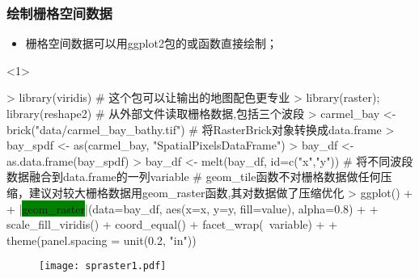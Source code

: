 \subsubsection{绘制栅格空间数据}
\begin{frame}[t,fragile]{\subsecname}{\subsubsecname}
\begin{itemize} 
\item<1-> 栅格空间数据可以用ggplot2包的或函数直接绘制；
\end{itemize}

\begin{overlayarea}{\textwidth}{\textheight}
\begin{onlyenv}<1>
\begin{rcode}
> library(viridis) # 这个包可以让输出的地图配色更专业 
> library(raster); library(reshape2)
# 从外部文件读取栅格数据,包括三个波段
> carmel_bay <- brick("data/carmel_bay_bathy.tif")
# 将RasterBrick对象转换成data.frame
> bay_spdf <- as(carmel_bay, "SpatialPixelsDataFrame")
> bay_df <- as.data.frame(bay_spdf)
> bay_df <- melt(bay_df, id=c("x","y")) # 将不同波段数据融合到data.frame的一列variable
# geom\_tile函数不对栅格数据做任何压缩，建议对较大栅格数据用geom\_raster函数,其对数据做了压缩优化
> ggplot() +
+     |\colorbox{green}{geom\_raster}|(data=bay_df, aes(x=x, y=y, fill=value), alpha=0.8) + 
+     scale_fill_viridis() + coord_equal() + facet_wrap(~variable) +
+     theme(panel.spacing = unit(0.2, "in"))
\end{rcode}
\begin{figure}[ht] \vspace{-10pt}
  \centering 
  \texttt{[image: spraster1.pdf]}
\end{figure}
\end{onlyenv}
\end{overlayarea}
\end{frame}

